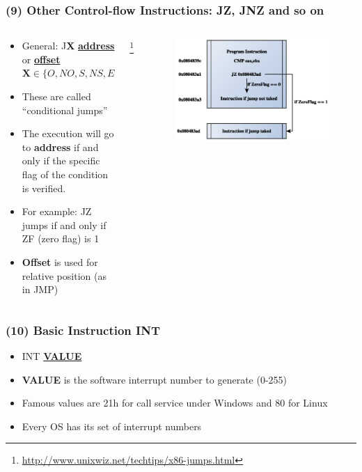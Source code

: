 \documentclass[]{beamer}
\begin{document}
\begin{frame}
  \frametitle{(9) Other Control-flow Instructions: JZ, JNZ and so on}
  \begin{columns}
    \begin{column}{2.5in}
      \begin{itemize}
      \item{General: J\textbf{X} \underline{\textbf{address}} or \underline{\textbf{offset}}}\\
        $ \mathbf{X} \in \{O,NO,S,NS,E,Z,NE...\}$\\
      \item{These are called ``conditional jumps''}
      \item {The execution will go to \textbf{address} if and only if
          the specific flag of the condition is verified.}
      \item {For example: JZ jumps if and only if ZF (zero flag) is 1}
      \item{\textbf{Offset} is used for relative position (as in JMP)}
      \end{itemize}
    \end{column}\footnote{\url{http://www.unixwiz.net/techtips/x86-jumps.html}}
    \begin{column}{2.5in}
      \begin{figure}
        \includegraphics[width=\textwidth]{images/j_unc.eps}									      \label{control}
        \label{Control Flow JZ}
      \end{figure}
    \end{column}

  \end{columns}
\end{frame}
\begin{frame}
  \frametitle{(10) Basic Instruction INT}
  \begin{itemize}
  \item{INT \underline{\textbf{VALUE}}}\\
  \item{\textbf{VALUE} is the software interrupt number to generate (0-255)}
  \item{Famous values are 21h for call service under Windows and 80 for Linux}
  \item{Every OS has its set of interrupt numbers}
  \end{itemize}
\end{frame}
\end{document}
